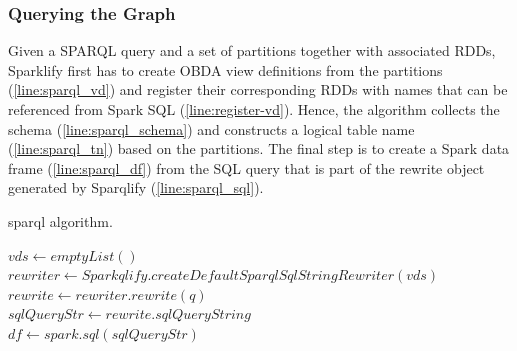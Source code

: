 \subsubsection{Querying the Graph}
Given a SPARQL query and a set of partitions together with associated RDDs, Sparklify
first has to create OBDA view definitions from the partitions (\autoref{line:sparql_vd}) and register their corresponding RDDs with names that can be referenced from Spark SQL (\autoref{line:register-vd}). Hence, the algorithm collects the schema (\autoref{line:sparql_schema}) and constructs a logical table name (\autoref{line:sparql_tn}) based on the partitions.
The final step is to create a Spark data frame (\autoref{line:sparql_df}) from the SQL query that is part of the rewrite object generated by Sparqlify (\autoref{line:sparql_sql}).

\begin{algorithm}[t]
\caption{sparql algorithm.}
\label{alg:sparql}
    $vds \leftarrow emptyList()$\\
    $rewriter \leftarrow Sparkqlify.createDefaultSparqlSqlStringRewriter(vds)$ \label{line:sparql_rewriter}\\
    $rewrite \leftarrow rewriter.rewrite(q)$\\
$sqlQueryStr \leftarrow rewrite.sqlQueryString$ \label{line:sparql_sql}\\
  $df \leftarrow spark.sql(sqlQueryStr)$ \label{line:sparql_df}\\

\end{algorithm}

